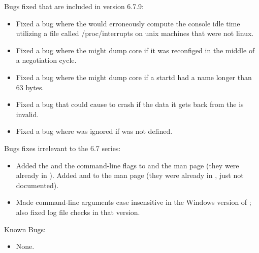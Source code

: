 \noindent Bugs fixed that are included in version 6.7.9:

\begin{itemize}

\item Fixed a bug where the  would erroneously compute the 
console idle time utilizing a file called /proc/interrupts on unix machines
that were not linux. 

\item Fixed a bug where the  might dump core if it was
reconfiged in the middle of a negotiation cycle.

\item Fixed a bug where the  might dump core if a startd
had a name longer than 63 bytes. 

\item Fixed a bug that could cause  to crash if the
data it gets back from the  is invalid.

\item Fixed a bug where
 was ignored if 
 was not defined.

\end{itemize}

\noindent Bugs fixes irrelevant to the 6.7 series:

\begin{itemize}

\item Added the  and the 
command-line flags to  and the 
man page (they were already in ).
Added  and  to the 
man page (they were already in , just not
documented).

\item Made command-line arguments case insensitive in the Windows
version of ; also fixed log file checks in
that version.

\end{itemize}

\noindent Known Bugs:

\begin{itemize}

\item None.

\end{itemize}


